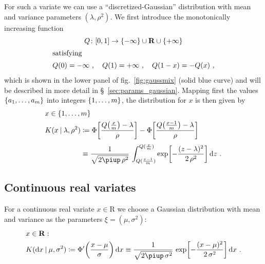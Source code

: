 \documentclass[\ifafour a4paper,12pt,\else a5paper,10pt,\fi%
onecolumn,oneside,article,%
british%
]{memoir}
\theoremstyle{remark}
\theoremstyle{innote}
\newcommand*{\pu}{\piup}%
\newcommand*{\di}{\mathrm{d}}%
\newcommand*{\RR}{\bm{\mathrm{R}}}
\newcommand*{\defd}{\coloneqq}
\DeclarePairedDelimiter\clcl{[}{]}
\DeclarePairedDelimiter\set{\{}{\}} %
\renewcommand*{\|}[1][]{\nonscript\:#1\vert\nonscript\:\mathopen{}}
\newcommand*{\sect}{\S}%
\newcommand*{\fig}{fig.}%
\newcommand*{\mur}{\mu}
\newcommand*{\sigmar}{\sigma}
\newcommand*{\mui}{\lambda}
\newcommand*{\sigmai}{\rho}
\begin{document}
For such a variate we can use a \enquote{discretized-Gaussian} distribution with mean and variance parameters $(\mui,\sigmai^{2})$. We first introduce the monotonically increasing function
\begin{gather}
    \label{eq:Q_function_integer}
    Q\colon \clcl{0,1} \to \set{-\infty}\cup\RR\cup\set{+\infty}
    \\ \shortintertext{satisfying}
    Q(0)=-\infty\ ,\quad Q(1)=+\infty \ ,
    \quad 
    Q(1-x)=-Q(x) \ ,
\end{gather}
which is shown in the lower panel of \fig~\ref{fig:gaussmix} (\textcolor{bluepurple}{solid blue} curve) and will be described in more detail in \sect~\ref{sec:params_gaussian}. Mapping first the values $\set{a_{1}, \dotsc, a_{m}}$ into integers $\set{1, \dotsc, m}$, the distribution for $x$ is then given by
\begin{equation}
  \label{eq:K_int}
  \begin{split}
    &x \in \set{1, \dotsc, m}
    \\
    &\!\begin{aligned}
  K(x \| \mui, \sigmai^{2}) &\defd
  \Phi\biggl[
  \frac{Q\bigl(\frac{x}{m}\bigr) - \mui}{\sigmai}
  \biggr]
  -
  \Phi\biggl[
  \frac{Q\bigl(\frac{x-1}{m}\bigr) - \mui}{\sigmai}
  \biggr]
  \\[\jot]&\equiv
  \frac{1}{\sqrt{2\pu\,\sigmai^{2}}}\,
  \int_{Q(\frac{x-1}{m})}^{Q(\frac{x}{m})}
  \exp\biggl[-\frac{(z-\mui)^{2}}{2\,\sigmai^{2}}\biggr]\, \di z \ .
\end{aligned}
\end{split}
\end{equation}


\subsection{Continuous real variates}
\label{sec:variates_real}

For a continuous real variate $x \in \RR$ we choose a Gaussian distribution with mean and variance as the parameters $\xi=(\mur, \sigmar^{2})$:
\begin{equation}
  \label{eq:K_unb_cont}
  \begin{split}
    &x \in \RR:
    \\
  &K(\di x \| \mur,\sigmar^{2}) \defd \Phi'\biggl(\frac{x-\mur}{\sigmar}\biggr)\, \di x
  \equiv \frac{1}{\sqrt{2\pu\,\sigmar^{2}}}\,
  \exp\biggl[-\frac{(x-\mur)^{2}}{2\,\sigmar^{2}}\biggr]\, \di x \ .
\end{split}
\end{equation}
\end{document}
